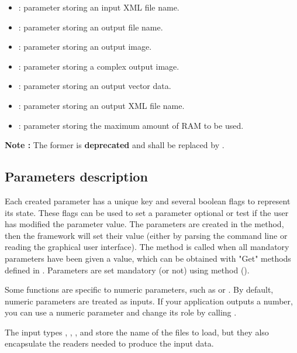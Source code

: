 \begin{itemize}
  \item {} : parameter storing an input XML file name.
  \item {} : parameter storing an output file name.
  \item {} : parameter storing an output image.
  \item {} : parameter storing a complex output image.
  \item {} : parameter storing an output vector data.
  \item {} : parameter storing an output XML file name.
  \item {} : parameter storing the maximum amount of RAM to be used.
\end{itemize}
\textbf{Note :} The former  is \textbf{deprecated} and shall be replaced by .

\subsection{Parameters description}

Each created parameter has a unique key and several boolean flags to represent its state. These flags
can be used to set a parameter optional or test if the user has modified the parameter value. The parameters
are created in the  method, then the framework will set their value (either by parsing the 
command line or reading the graphical user interface). The  method is called when all 
mandatory parameters have been given a value, which can be obtained with "Get" methods defined in 
. Parameters are set mandatory (or not) using  method ().

Some functions are specific to numeric parameters, such as 
or . By default, numeric parameters are treated as inputs.
If your application outputs a number, you can use a numeric parameter and change its role by calling 
.

The input types , , , 
and  store the name of the files to load, but they also encapsulate the 
readers needed to produce the input data.

